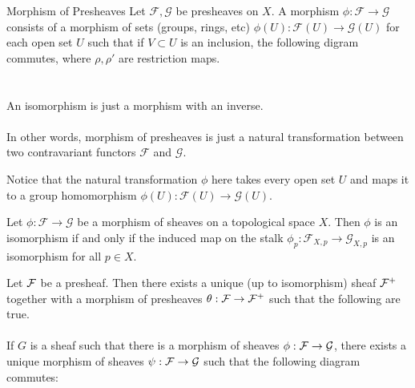 \documentclass[a4paper]{article}
\begin{document}
\begin{defn}{Morphism of Presheaves}{} Let $\mathcal{F},\mathcal{G}$ be presheaves on $X$. A morphism $\phi:\mathcal{F}\to\mathcal{G}$ consists of a morphism of sets (groups, rings, etc) $\phi(U):\mathcal{F}(U)\to\mathcal{G}(U)$ for each open set $U$ such that if $V\subset U$ is an inclusion, the following digram commutes, where $\rho,\rho'$ are restriction maps. \\~\\
 \\
An isomorphism is just a morphism with an inverse. \\~\\
In other words, morphism of presheaves is just a natural transformation between two contravariant functors $\mathcal{F}$ and $\mathcal{G}$. 
\end{defn}

Notice that the natural transformation $\phi$ here takes every open set $U$ and maps it to a group homomorphism $\phi(U):\mathcal{F}(U)\to\mathcal{G}(U)$. 

\begin{prp}{}{} Let $\phi:\mathcal{F}\to\mathcal{G}$ be a morphism of sheaves on a topological space $X$. Then $\phi$ is an isomorphism if and only if the induced map on the stalk $\phi_p:\mathcal{F}_{X,p}\to\mathcal{G}_{X,p}$ is an isomorphism for all $p\in X$. 
\end{prp}

\begin{thm}{}{} Let $\mathcal{F}$ be a presheaf. Then there exists a unique (up to isomorphism) sheaf $\mathcal{F}^+$ together with a morphism of presheaves $\theta:\mathcal{F}\to\mathcal{F}^+$ such that the following are true. \\~\\

If $G$ is a sheaf such that there is a morphism of sheaves $\phi:\mathcal{F}\to\mathcal{G}$, there exists a unique morphism of sheaves $\psi:\mathcal{F}\to\mathcal{G}$ such that the following diagram commutes: \\~\\
 \\
\end{thm}
\end{document}
